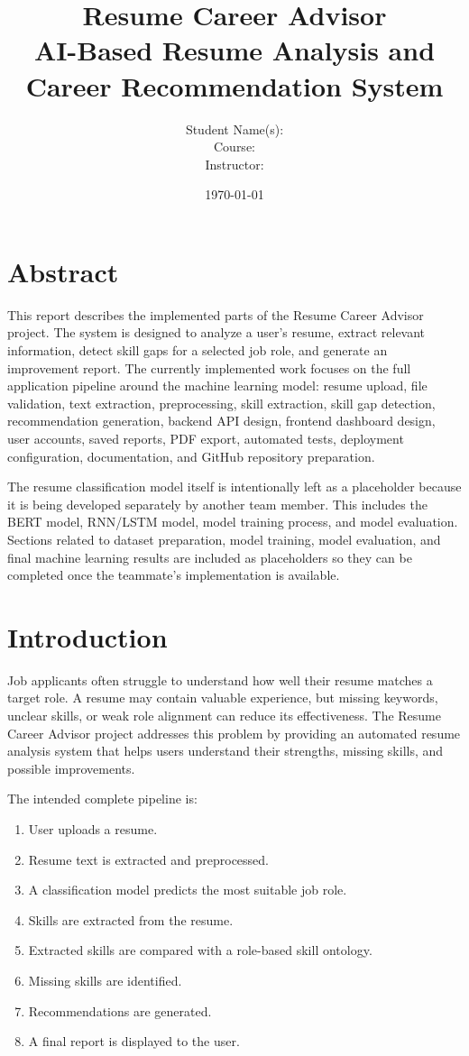 \documentclass[12pt,a4paper]{article}
\title{\textbf{Resume Career Advisor}\\
\large AI-Based Resume Analysis and Career Recommendation System}
\author{
    Student Name(s): \underline{\hspace{7cm}}\\
    Course: \underline{\hspace{7cm}}\\
    Instructor: \underline{\hspace{7cm}}
}
\date{\today}
\begin{document}
\maketitle
\newpage

\tableofcontents
\newpage

\section{Abstract}

This report describes the implemented parts of the Resume Career Advisor project. The system is designed to analyze a user's resume, extract relevant information, detect skill gaps for a selected job role, and generate an improvement report. The currently implemented work focuses on the full application pipeline around the machine learning model: resume upload, file validation, text extraction, preprocessing, skill extraction, skill gap detection, recommendation generation, backend API design, frontend dashboard design, user accounts, saved reports, PDF export, automated tests, deployment configuration, documentation, and GitHub repository preparation.

The resume classification model itself is intentionally left as a placeholder because it is being developed separately by another team member. This includes the BERT model, RNN/LSTM model, model training process, and model evaluation. Sections related to dataset preparation, model training, model evaluation, and final machine learning results are included as placeholders so they can be completed once the teammate's implementation is available.

\section{Introduction}

Job applicants often struggle to understand how well their resume matches a target role. A resume may contain valuable experience, but missing keywords, unclear skills, or weak role alignment can reduce its effectiveness. The Resume Career Advisor project addresses this problem by providing an automated resume analysis system that helps users understand their strengths, missing skills, and possible improvements.

The intended complete pipeline is:

\begin{enumerate}
    \item User uploads a resume.
    \item Resume text is extracted and preprocessed.
    \item A classification model predicts the most suitable job role.
    \item Skills are extracted from the resume.
    \item Extracted skills are compared with a role-based skill ontology.
    \item Missing skills are identified.
    \item Recommendations are generated.
    \item A final report is displayed to the user.
\end{enumerate}
\end{document}
